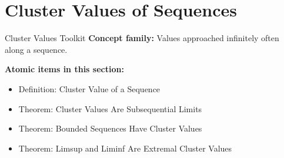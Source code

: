 \section{Cluster Values of Sequences}

\begin{toolkitbox}{Cluster Values Toolkit}
\textbf{Concept family:} Values approached infinitely often along a sequence.

\medskip
\textbf{Atomic items in this section:}
\begin{itemize}
  \item Definition: Cluster Value of a Sequence
  \item Theorem: Cluster Values Are Subsequential Limits
  \item Theorem: Bounded Sequences Have Cluster Values
  \item Theorem: Limsup and Liminf Are Extremal Cluster Values
\end{itemize}
\end{toolkitbox}



